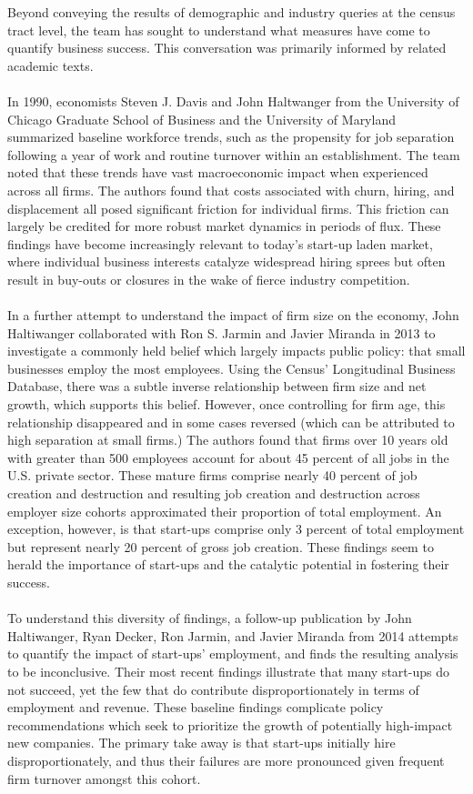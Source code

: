 \documentclass[article, 11pt]{article} %
\begin{document}
Beyond conveying the results of demographic and industry queries at the census tract level, the team has sought to understand what measures have come to quantify business success. This conversation was primarily informed by related academic texts.
\\\\
In 1990, economists Steven J. Davis and John Haltwanger from the University of Chicago Graduate School of Business and the University of Maryland summarized baseline workforce trends, such as the propensity for job separation following a year of work and routine turnover within an establishment. The team noted that these trends have vast macroeconomic impact when experienced across all firms. The authors found that costs associated with churn, hiring, and displacement all posed significant friction for individual firms. \cite{Davis} This friction can largely be credited for more robust market dynamics in periods of flux. These findings have become increasingly relevant to today's start-up laden market, where individual business interests catalyze widespread hiring sprees but often result in buy-outs or closures in the wake of fierce industry competition.
\\\\
In a further attempt to understand the impact of firm size on the economy, John Haltiwanger collaborated with Ron S. Jarmin and Javier Miranda in 2013 to investigate a commonly held belief which largely impacts public policy: that small businesses employ the most employees. Using the Census' Longitudinal Business Database, there was a subtle inverse relationship between firm size and net growth, which supports this belief. However, once controlling for firm age, this relationship disappeared and in some cases reversed (which can be attributed to high separation at small firms.) The authors found that firms over 10 years old with greater than 500 employees account for about 45 percent of all jobs in the U.S. private sector. These mature firms comprise nearly 40 percent of job creation and destruction and resulting job creation and destruction across employer size cohorts approximated their proportion of total employment. An exception, however, is that start-ups comprise only 3 percent of total employment but represent nearly 20 percent of gross job creation. \cite{Haltiwanger} These findings seem to herald the importance of start-ups and the catalytic potential in fostering their success.
\\\\
To understand this diversity of findings, a follow-up publication by John Haltiwanger, Ryan Decker, Ron Jarmin, and Javier Miranda from 2014 attempts to quantify the impact of start-ups' employment, and finds the resulting analysis to be inconclusive. Their most recent findings illustrate that many start-ups do not succeed, yet the few that do contribute disproportionately in terms of employment and revenue. These baseline findings complicate policy recommendations which seek to prioritize the growth of potentially high-impact new companies. The primary take away is that start-ups initially hire disproportionately, and thus their failures are more pronounced given frequent firm turnover amongst this cohort. \cite{Decker} 
\end{document}
